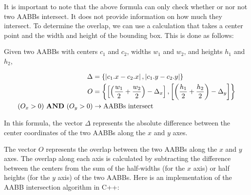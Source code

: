 \documentclass{article}
\renewcommand{\land}{\,\,\textrm{\textbf{AND}}\,\,}
\begin{document}
It is important to note that the above formula can only check whether or nor
not two AABBs intersect. It does not provide information on how much they
intersect. To determine the overlap, we can use a calculation that takes a
center point and the width and height of the bounding box. This is done as
follows:

Given two AABBs with centers $c_1$ and $c_2$, widths $w_1$ and $w_2$, and
heights $h_1$ and $h_2$,

\begin{equation}
    \begin{aligned}
        \Delta                        & = \left\{ \left| c_1.x - c_2.x \right| , \left| c_1.y - c_2.y \right| \right\}                                                                                     \\
        O                             & = \left\{ \left[ \left( \frac{w_1}{2} + \frac{w_2}{2} \right) - \Delta_x \right] , \left[ \left( \frac{h_1}{2} + \frac{h_2}{2} \right) - \Delta_y \right] \right\} \\
        ( O_x > 0 ) \land ( O_y > 0 ) & \rightarrow \text{AABBs intersect}
    \end{aligned}
\end{equation}

In this formula, the vector $\Delta$ represents the absolute difference between
the center coordinates of the two AABBs along the $x$ and $y$ axes.

The vector $O$ represents the overlap between the two AABBs along the $x$ and
$y$ axes. The overlap along each axis is calculated by subtracting the
difference between the centers from the sum of the half-widths (for the $x$
axis) or half heights (for the $y$ axis) of the two AABBs. Here is an
implementation of the AABB intersection algorithm in C++:
\end{document}
